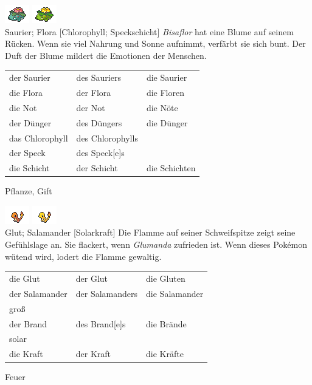 \documentclass[a7paper,10pt,%
,toc
,print
]{kartei}
\begin{document}
\begin{karte}[Notdünger]{
\includegraphics{../regular/venusaur}
\includegraphics{../shiny/venusaur} \\
Saurier; Flora
}[Chlorophyll; Speckschicht]
\emph{Bisaflor} hat eine Blume auf seinem Rücken. Wenn sie viel Nahrung und
Sonne aufnimmt, verfärbt sie sich bunt. Der Duft der Blume mildert die Emotionen
der Menschen.

\vspace{5pt}
\begin{tabular}{lll}
der Saurier & des Sauriers & die Saurier \\
die Flora & der Flora & die Floren \\
die Not & der Not & die Nöte \\
der Dünger & des Düngers & die Dünger \\
das Chlorophyll & des Chlorophylls & \\
der Speck & des Speck[e]s & \\
die Schicht & der Schicht & die Schichten \\
\end{tabular}
\vspace{5pt}

Pflanze, Gift
\end{karte}


\begin{karte}[Großbrand]{
\includegraphics{../regular/charmander}
\includegraphics{../shiny/charmander} \\
Glut; Salamander
}[Solarkraft]
Die Flamme auf seiner Schweifspitze zeigt seine Gefühlslage an. Sie flackert,
wenn \emph{Glumanda} zufrieden ist. Wenn dieses Pokémon wütend wird, lodert die
Flamme gewaltig.

\vspace{5pt}
\begin{tabular}{lll}
die Glut	&	der Glut	&	die Gluten \\
der Salamander	&	der Salamanders	&	die Salamander \\
groß \\
der Brand	&	des Brand[e]s	&	die Brände \\
solar \\
die Kraft	&	der Kraft	&	die Kräfte \\
\end{tabular}
\vspace{5pt}

Feuer
\end{karte}
\end{document}
